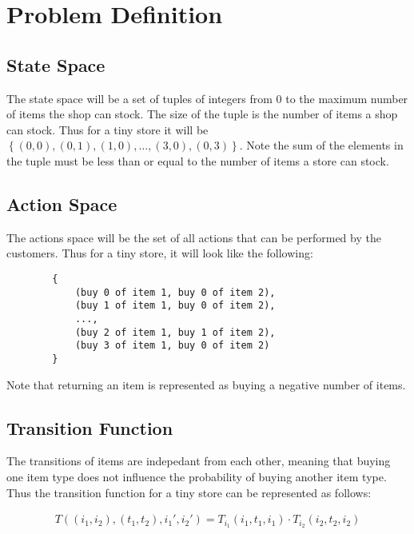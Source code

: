 \documentclass[12pt]{article}
\begin{document}
    \maketitle

    \section{Problem Definition}

    \subsection{State Space}
    The state space will be a set of tuples of integers from 0 to the maximum number of items the shop can stock. The size of the tuple is the number of items a shop can stock. 
    Thus for a tiny store it will be $\left\{(0, 0), (0, 1), (1, 0), \ldots, (3, 0), (0, 3)\right\}$. Note the sum of the elements in the tuple must be less than or equal to the number of items a store can stock.

    \subsection{Action Space}
    The actions space will be the set of all actions that can be performed by the customers. 
    Thus for a tiny store, it will look like the following:

    \begin{verbatim}
        {
            (buy 0 of item 1, buy 0 of item 2),
            (buy 1 of item 1, buy 0 of item 2),
            ...,
            (buy 2 of item 1, buy 1 of item 2),
            (buy 3 of item 1, buy 0 of item 2)
        }
    \end{verbatim}

    Note that returning an item is represented as buying a negative number of items.

    \subsection{Transition Function}

    The transitions of items are indepedant from each other, meaning that buying one item type does not influence the probability of buying another item type. Thus the transition function for a tiny store can be represented as follows:

    \begin{align*}
        T((i_1, i_2), (t_1, t_2), i_1', i_2') = T_{i_1}(i_1, t_1, i_1) \cdot T_{i_2}(i_2, t_2, i_2)
    \end{align*}
\end{document}
